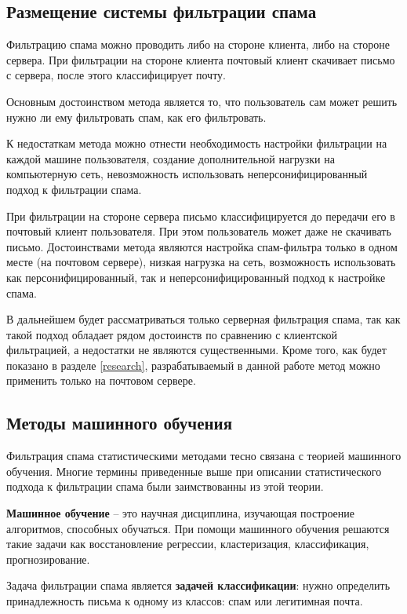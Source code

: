\subsection{Размещение системы фильтрации  спама}
Фильтрацию спама можно проводить либо на стороне клиента, либо на стороне сервера. 
При фильтрации на стороне клиента почтовый клиент скачивает письмо с сервера, после этого классифицирует почту. 

Основным достоинством метода является то, что пользователь сам может решить нужно ли ему фильтровать спам, как его фильтровать.

К недостаткам метода можно отнести необходимость настройки фильтрации на каждой машине пользователя, создание  дополнительной нагрузки на компьютерную сеть, невозможность использовать неперсонифицированный подход к фильтрации спама.


При фильтрации на стороне сервера письмо классифицируется до передачи его в почтовый клиент пользователя. При этом пользователь может даже не скачивать письмо. Достоинствами метода являются настройка спам-фильтра только в одном месте (на почтовом сервере), низкая нагрузка на сеть, возможность использовать как персонифицированный, так и неперсонифицированный подход к настройке спама.

В дальнейшем будет рассматриваться только серверная фильтрация спама, так как такой подход обладает рядом достоинств по сравнению с клиентской фильтрацией, а недостатки не являются существенными. Кроме того, как будет показано в разделе \ref{research}, разрабатываемый в данной работе метод можно применить только на почтовом сервере.



\subsection{Методы машинного обучения}
\label{MLINTRO}
Фильтрация спама статистическими методами тесно связана с теорией машинного обучения. Многие термины приведенные выше при описании статистического подхода к фильтрации спама были заимствованны из этой теории.


\textbf{Машинное обучение} – это научная дисциплина, изучающая построение алгоритмов, способных обучаться\cite{VORONCOV}. При помощи машинного обучения решаются такие задачи как восстановление регрессии, кластеризация, классификация, прогнозирование.  

Задача фильтрации спама является \textbf{задачей классификации}: нужно определить принадлежность письма к одному из классов: спам или легитимная почта.

